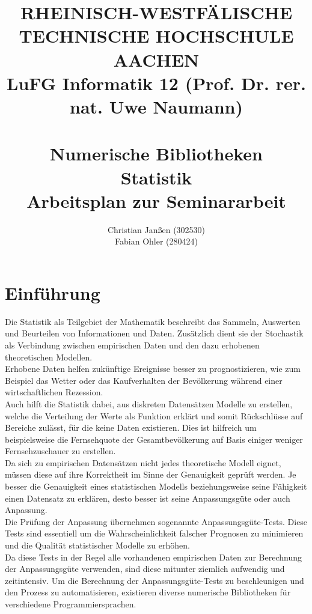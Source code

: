 \documentclass{article}
\title{
{\bf \scriptsize RHEINISCH-WESTF\"ALISCHE TECHNISCHE HOCHSCHULE AACHEN \\
LuFG Informatik 12 (Prof. Dr. rer. nat. Uwe Naumann)}
\vspace{.5cm} \\
\epsfig{file=figures/STCE_Logo_WWW.eps,width=.7\textwidth}
\vspace{1cm} \\
{\bf \Large Numerische Bibliotheken} \\
{\bf \large Statistik} \\
{\large Arbeitsplan zur Seminararbeit} 
}
\author{Christian Janßen (302530) \\ Fabian Ohler (280424) }
\begin{document}

\begin{titlepage}
\clearpage
\maketitle

\thispagestyle{empty}

\end{titlepage}

\pagestyle{headings}
\newpage
\section{Einführung}
Die Statistik als Teilgebiet der Mathematik beschreibt das Sammeln, Auswerten und Beurteilen von Informationen und Daten.
Zusätzlich dient sie der Stochastik als Verbindung zwischen empirischen Daten und den dazu erhobenen theoretischen Modellen.\\
Erhobene Daten helfen zukünftige Ereignisse besser zu prognostizieren, wie zum Beispiel das Wetter oder das Kaufverhalten der Bevölkerung während einer wirtschaftlichen Rezession.\\
Auch hilft die Statistik dabei, aus diskreten Datensätzen Modelle zu erstellen, welche die Verteilung der Werte als Funktion erklärt und somit Rückschlüsse auf Bereiche zulässt, für die keine Daten existieren. Dies ist hilfreich um beispielsweise die Fernsehquote der Gesamtbevölkerung auf Basis einiger weniger Fernsehzuschauer zu erstellen.\\
Da sich zu empirischen Datensätzen nicht jedes theoretische Modell eignet, müssen diese auf ihre Korrektheit im Sinne der Genauigkeit geprüft werden. Je besser die Genauigkeit eines statistischen Modells beziehungsweise seine Fähigkeit einen Datensatz zu erklären, desto besser ist seine Anpassungsgüte oder auch Anpassung.\\
Die Prüfung der Anpassung übernehmen sogenannte Anpassungsgüte-Tests. Diese Tests sind essentiell um die Wahrscheinlichkeit falscher Prognosen zu minimieren und die Qualität statistischer Modelle zu erhöhen.\\
Da diese Tests in der Regel alle vorhandenen empirischen Daten zur Berechnung der Anpassungsgüte verwenden, sind diese mitunter ziemlich aufwendig und zeitintensiv. Um die Berechnung der Anpassungsgüte-Tests zu beschleunigen und den Prozess zu automatisieren, existieren diverse numerische Bibliotheken für verschiedene Programmiersprachen.\\
\end{document}
